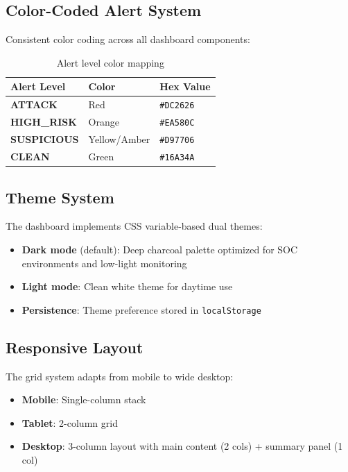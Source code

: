 \documentclass[12pt,a4paper]{article}
\begin{document}
\subsection{Color-Coded Alert System}

Consistent color coding across all dashboard components:

\begin{table}[H]
\centering
\begin{tabular}{>{\bfseries}l l l}
\toprule
Alert Level & Color & Hex Value \\
\midrule
ATTACK & Red & \texttt{\#DC2626} \\
HIGH\_RISK & Orange & \texttt{\#EA580C} \\
SUSPICIOUS & Yellow/Amber & \texttt{\#D97706} \\
CLEAN & Green & \texttt{\#16A34A} \\
\bottomrule
\end{tabular}
\caption{Alert level color mapping}
\end{table}

\subsection{Theme System}

The dashboard implements CSS variable-based dual themes:

\begin{itemize}[noitemsep]
    \item \textbf{Dark mode} (default): Deep charcoal palette optimized for SOC environments and low-light monitoring
    \item \textbf{Light mode}: Clean white theme for daytime use
    \item \textbf{Persistence}: Theme preference stored in \texttt{localStorage}
\end{itemize}

\subsection{Responsive Layout}

The grid system adapts from mobile to wide desktop:

\begin{itemize}[noitemsep]
    \item \textbf{Mobile}: Single-column stack
    \item \textbf{Tablet}: 2-column grid
    \item \textbf{Desktop}: 3-column layout with main content (2 cols) + summary panel (1 col)
\end{itemize}
\end{document}
